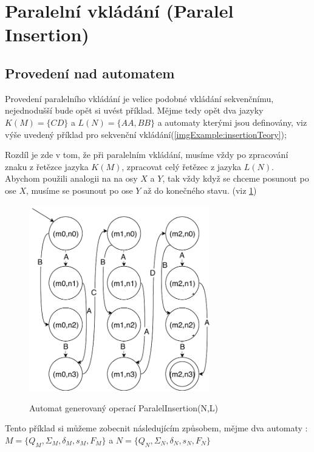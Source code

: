 \section{Paralelní vkládání (Paralel Insertion)}
\subsection{Provedení nad automatem}
Provedení paralelního vkládání je velice podobné vkládání sekvenčnímu, nejednodušší bude opět si uvést příklad. Mějme tedy opět dva jazyky $K(M)=\{CD\}$ a $L(N)=\{AA, BB\}$ a automaty kterými jsou definovány, viz výše uvedený příklad pro sekvenční vkládání(\ref{imgExample:insertionTeory});

Rozdíl je zde v tom, že při paralelním vkládání, musíme vždy po zpracování znaku z řetězce jazyka $K(M)$, zpracovat celý řetězec z jazyka $L(N)$. Abychom použili analogii na na osy $X$ a $Y$, tak vždy když se chceme posunout po ose $X$, musíme se posunout po ose $Y$ až do konečného stavu. (viz \ref{imgExample:paralelinsertionResult})
\begin{figure}[H]
\centering
\includegraphics[width=0.7\textwidth]{obrazky-figures/paralelInserionResult.pdf}
\label{imgExample:paralelinsertionResult}
\caption{Automat generovaný operací ParalelInsertion(N,L)}
\end{figure}

Tento příklad si můžeme zobecnit následujícím způsobem, mějme dva automaty :
$M=\{Q_{M}, \Sigma_{M}, \delta_{M},s_{M}, F_{M}\}$ a $N=\{Q_{N}, \Sigma_{N}, \delta_{N},s_{N}, F_{N}\} $

